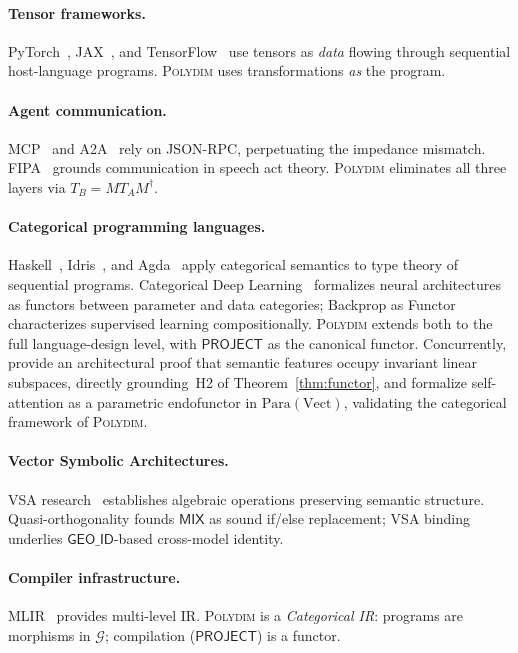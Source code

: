 \documentclass[10pt,twocolumn]{article}
\theoremstyle{plain}
\theoremstyle{definition}
\theoremstyle{remark}
\newcommand{\Mix}{\mathsf{MIX}}
\newcommand{\Project}{\mathsf{PROJECT}}
\newcommand{\GeoID}{\mathsf{GEO\_ID}}
\begin{document}
\paragraph{Tensor frameworks.}
PyTorch~\citep{paszke2019pytorch}, JAX~\citep{bradbury2018jax}, and
TensorFlow~\citep{abadi2016tensorflow} use tensors as \emph{data} flowing
through sequential host-language programs. \textsc{Polydim} uses
transformations \emph{as} the program.

\paragraph{Agent communication.}
MCP~\citep{anthropic2024mcp} and A2A~\citep{google2025a2a} rely on JSON-RPC,
perpetuating the impedance mismatch. FIPA~\citep{fipa2002acl} grounds
communication in speech act theory. \textsc{Polydim} eliminates all three
layers via $T_B=MT_AM^\dagger$.

\paragraph{Categorical programming languages.}
Haskell~\citep{jones2003haskell}, Idris~\citep{brady2013idris},
and Agda~\citep{norell2007agda} apply categorical semantics to type theory of
sequential programs. Categorical Deep Learning~\citep{gavranovic2024categorical}
formalizes neural architectures as functors between parameter and data
categories; Backprop as Functor~\citep{fong2019backprop} characterizes supervised
learning compositionally. \textsc{Polydim} extends both to the full language-design
level, with $\Project$ as the canonical functor. Concurrently,
\citet{suarez2026invariant} provide an architectural proof that semantic features
occupy invariant linear subspaces, directly grounding~H2 of Theorem~\ref{thm:functor},
and \citet{oneill2025endofunctor} formalize self-attention as a parametric
endofunctor in $\mathrm{Para}(\mathrm{Vect})$, validating the categorical
framework of \textsc{Polydim}.

\paragraph{Vector Symbolic Architectures.}
VSA research~\citep{plate1995,kanerva2009,frady2021} establishes algebraic
operations preserving semantic structure. Quasi-orthogonality founds $\Mix$
as sound if/else replacement; VSA binding underlies $\GeoID$-based
cross-model identity.

\paragraph{Compiler infrastructure.}
MLIR~\citep{lattner2021mlir} provides multi-level IR. \textsc{Polydim} is
a \emph{Categorical IR}: programs are morphisms in $\mathcal{G}$;
compilation ($\Project$) is a functor.
\end{document}
